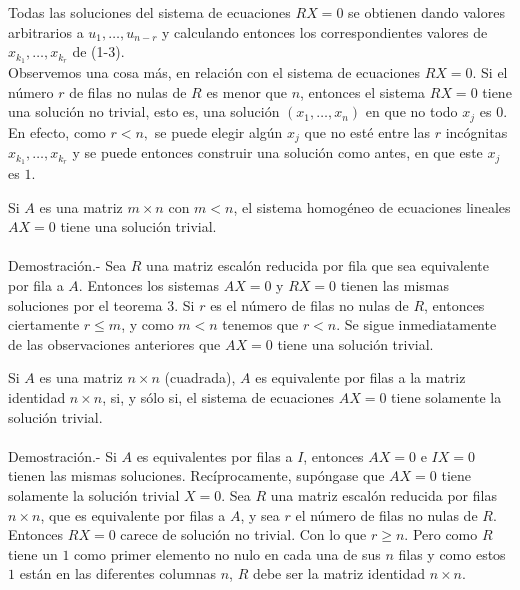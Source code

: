 Todas las soluciones del sistema de ecuaciones $RX=0$ se obtienen dando valores arbitrarios a $u_1,\ldots,u_{n-r}$ y calculando entonces los correspondientes valores de $x_{k_1},\ldots , x_{k_r}$ de (1-3).\\

Observemos una cosa más, en relación con el sistema de ecuaciones $RX=0$. Si el número $r$ de filas no nulas de $R$ es menor que $n$, entonces el sistema $RX=0$ tiene una solución no trivial, esto es, una solución $(x_1,\ldots , x_n)$ en que no todo $x_j$ es $0$. En efecto, como $r<n,$ se puede elegir algún $x_j$ que no esté entre las $r$ incógnitas $x_{k_1},\ldots , x_{k_r}$ y se puede entonces construir una solución como antes, en que este $x_j$ es $1$.


\begin{teo}
    Si $A$ es una matriz $m\times n$ con $m<n$, el sistema homogéneo de ecuaciones lineales $AX=0$ tiene una solución trivial.\\\\
	Demostración.-\; Sea $R$ una matriz escalón reducida por fila que sea equivalente por fila a $A$. Entonces los sistemas $AX=0$ y $RX=0$ tienen las mismas soluciones por el teorema 3. Si $r$ es el número de filas no nulas de $R$, entonces ciertamente $r\leq m$, y como $m<n$ tenemos que $r<n$. Se sigue inmediatamente de las observaciones anteriores que $AX=0$ tiene una solución trivial.
\end{teo}

\begin{teo}
    Si $A$ es una matriz $n\times n$ (cuadrada), $A$ es equivalente por filas a la matriz identidad $n\times n$, si, y sólo si, el sistema de ecuaciones $AX=0$ tiene solamente la solución trivial.\\\\
	Demostración.-\; Si $A$ es equivalentes por filas a $I$, entonces $AX=0$ e $IX=0$ tienen las mismas soluciones. Recíprocamente, supóngase que $AX=0$ tiene solamente la solución trivial $X=0$. Sea $R$ una matriz escalón reducida por filas $n\times n$, que es equivalente por filas a $A$, y sea $r$ el número de filas no nulas de $R$. Entonces $RX=0$ carece de solución no trivial. Con lo que $r\geq n.$ Pero como $R$ tiene un $1$ como primer elemento no nulo en cada una de sus $n$ filas y como estos $1$ están en las diferentes columnas $n$, $R$ debe ser la matriz identidad $n\times n$.
\end{teo}

